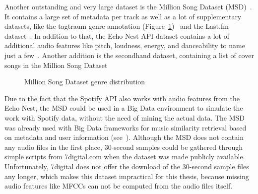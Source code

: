 Another outstanding and very large dataset is the Million Song Dataset (MSD)~\cite{msd1}. 
It contains a large set of metadata per track as well as a lot of supplementary datasets, like the tagtraum genre annotation (Figure~\ref{msddist})~\cite{msd5} and the Last.fm dataset~\cite{msd2}. In addition to that, the Echo Nest API dataset contains a lot of additional audio features like pitch, loudness, energy, and danceability to name just a few~\cite{msd3}. 
Another addition is the secondhand dataset, containing a list of cover songs in the Million Song Dataset\cite{msd6}
\begin{figure}[thpb]
	\centering
	\caption{Million Song Dataset genre distribution~\cite[p. 6]{msd5}}
	\label{msddist}
\end{figure}
\FloatBarrier
\noindent Due to the fact that the Spotify API\cite{spotifyapi1} also works with audio features from the Echo Nest\cite{echonest1}, the MSD could be used in a Big Data environment to simulate the work with Spotify data, without the need of mining the actual data. The MSD was already used with Big Data frameworks for music similarity retrieval based on metadata and user information (see~\cite{msd4}). Although the MSD does not contain any audio files in the first place, 30-second samples could be gathered through simple scripts from 7digital.com when the dataset was made publicly available. Unfortunately, 7digital does not offer the download of the 30-second sample files any longer, which makes this dataset impractical for this thesis, because missing audio features like MFCCs can not be computed from the audio files itself. 
